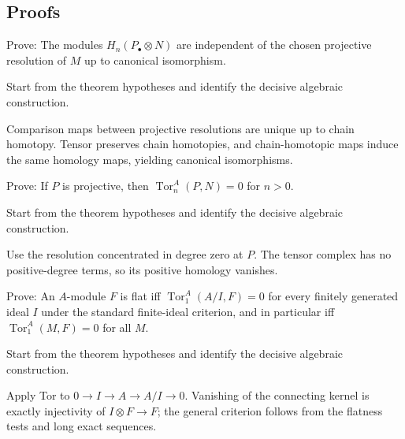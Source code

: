 \subsection*{Proofs}

\begin{exercise}\label{exr:v26-expand-06}
Prove: The modules $H_n(P_\bullet\otimes N)$ are independent of the chosen projective resolution of $M$ up to canonical isomorphism.
\end{exercise}
\begin{hint}
Start from the theorem hypotheses and identify the decisive algebraic construction.
\end{hint}
\begin{solution}
Comparison maps between projective resolutions are unique up to chain homotopy. Tensor preserves chain homotopies, and chain-homotopic maps induce the same homology maps, yielding canonical isomorphisms.
\end{solution}

\begin{exercise}\label{exr:v26-expand-07}
Prove: If $P$ is projective, then $\operatorname{Tor}_n^A(P,N)=0$ for $n>0$.
\end{exercise}
\begin{hint}
Start from the theorem hypotheses and identify the decisive algebraic construction.
\end{hint}
\begin{solution}
Use the resolution concentrated in degree zero at $P$. The tensor complex has no positive-degree terms, so its positive homology vanishes.
\end{solution}

\begin{exercise}\label{exr:v26-expand-08}
Prove: An $A$-module $F$ is flat iff $\operatorname{Tor}_1^A(A/I,F)=0$ for every finitely generated ideal $I$ under the standard finite-ideal criterion, and in particular iff $\operatorname{Tor}_1^A(M,F)=0$ for all $M$.
\end{exercise}
\begin{hint}
Start from the theorem hypotheses and identify the decisive algebraic construction.
\end{hint}
\begin{solution}
Apply Tor to $0\to I\to A\to A/I\to0$. Vanishing of the connecting kernel is exactly injectivity of $I\otimes F\to F$; the general criterion follows from the flatness tests and long exact sequences.
\end{solution}

